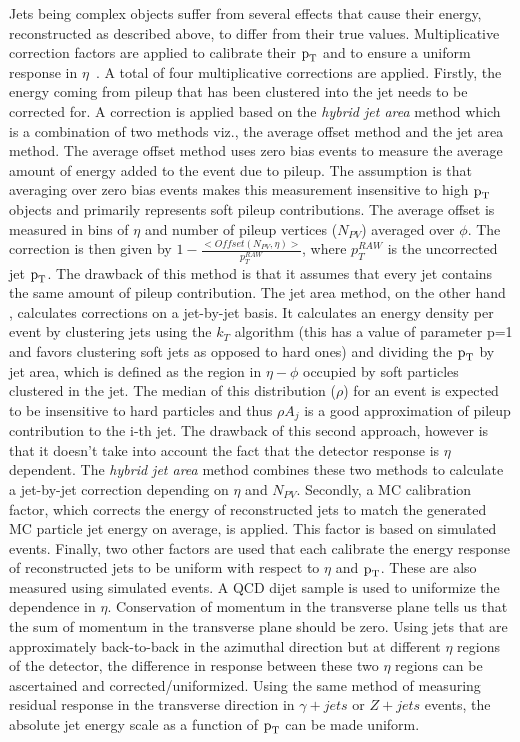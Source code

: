 Jets being complex objects suffer from several effects that cause their energy, reconstructed as described above, to differ from their true values. Multiplicative correction factors are applied to calibrate their $\text{p}_\text{T}$ and to ensure a uniform response in $\eta$~\cite{jet_recon1,jet_recon2}. A total of four multiplicative corrections are applied. Firstly, the energy coming from pileup that has been clustered into the jet needs to be corrected for. A correction is applied based on the \textit{hybrid jet area} method which is a combination of two methods viz., the average offset method and the jet area method. The average offset method uses zero bias events to measure the average amount of energy added to the event due to pileup. The assumption is that averaging over zero bias events makes this measurement insensitive to high $\text{p}_\text{T}$ objects and primarily represents soft pileup contributions. The average offset is measured in bins of $\eta$ and number of pileup vertices ($N_{PV}$) averaged over $\phi$. The correction is then given by $1-\frac{<Offset(N_{PV},\eta)>}{p_{T}^{RAW}}$, where $p_{T}^{RAW}$  is the uncorrected jet $\text{p}_\text{T}$. The drawback of this method is that it assumes that every jet contains the same amount of pileup contribution. The jet area method, on the other hand , calculates corrections on a jet-by-jet basis. It calculates an energy density  per event  by clustering jets using the $k_{T}$ algorithm (this has a value of parameter p=1 and favors clustering soft jets as opposed to hard ones) and dividing the $\text{p}_\text{T}$ by jet area, which is defined as the region in $\eta-\phi$ occupied by soft particles clustered in the jet. The median of this distribution ($\rho$) for an event is expected to be insensitive to hard particles and thus $\rho A_{j}$ is a good approximation of pileup contribution to the i-th jet. The drawback of this second approach, however is that it doesn't take into account the fact that the detector response is $\eta$ dependent. The \textit{hybrid jet area} method combines these two methods to calculate a jet-by-jet correction depending on $\eta$ and $N_{PV}$. Secondly, a MC calibration factor, which corrects the energy of reconstructed jets to match the generated MC particle jet energy on average, is applied. This factor is based on simulated events. Finally, two other factors are used that each calibrate the energy response of reconstructed jets to be uniform with respect to $\eta$ and $\text{p}_\text{T}$. These are also measured using simulated events. A QCD dijet sample is used to uniformize the dependence in $\eta$. Conservation of momentum in the transverse plane tells us that the sum of momentum in the transverse plane should be zero. Using jets that are approximately back-to-back in the azimuthal direction but at different $\eta$ regions of the detector, the difference in response between these two $\eta$ regions can be ascertained and corrected/uniformized. Using the same method of measuring residual response in the transverse direction in $\gamma + jets$ or $Z +jets$  events, the absolute jet energy scale as a function of $\text{p}_\text{T}$ can be made uniform.


